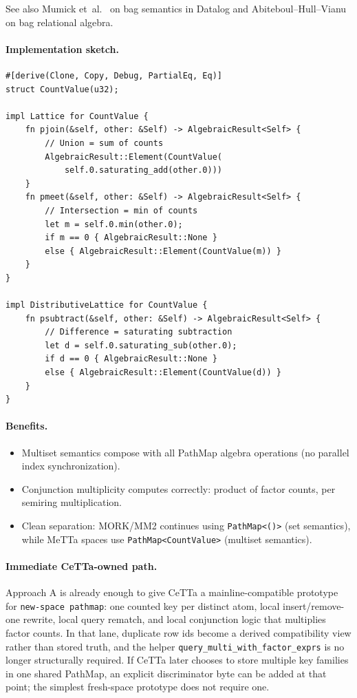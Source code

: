 \documentclass[11pt]{article}
\theoremstyle{definition}
\theoremstyle{remark}
\newcommand{\MORK}{\textup{MORK}}
\newcommand{\MeTTa}{\textup{MeTTa}}
\newcommand{\PathMap}{\textup{PathMap}}
\begin{document}
See also Mumick et~al.~\cite{MumickMagicDuplicates1990} on bag semantics
in Datalog and Abiteboul--Hull--Vianu~\cite{AHV1995} on bag relational
algebra.

\paragraph{Implementation sketch.}
\begin{lstlisting}[caption={Semiring \texttt{Lattice} for multiset counts (Rust pseudocode).}]
#[derive(Clone, Copy, Debug, PartialEq, Eq)]
struct CountValue(u32);

impl Lattice for CountValue {
    fn pjoin(&self, other: &Self) -> AlgebraicResult<Self> {
        // Union = sum of counts
        AlgebraicResult::Element(CountValue(
            self.0.saturating_add(other.0)))
    }
    fn pmeet(&self, other: &Self) -> AlgebraicResult<Self> {
        // Intersection = min of counts
        let m = self.0.min(other.0);
        if m == 0 { AlgebraicResult::None }
        else { AlgebraicResult::Element(CountValue(m)) }
    }
}

impl DistributiveLattice for CountValue {
    fn psubtract(&self, other: &Self) -> AlgebraicResult<Self> {
        // Difference = saturating subtraction
        let d = self.0.saturating_sub(other.0);
        if d == 0 { AlgebraicResult::None }
        else { AlgebraicResult::Element(CountValue(d)) }
    }
}
\end{lstlisting}

\paragraph{Benefits.}
\begin{itemize}[nosep]
  \item Multiset semantics compose with all \PathMap{} algebra operations
    (no parallel index synchronization).
  \item Conjunction multiplicity computes correctly: product of factor
    counts, per semiring multiplication.
  \item Clean separation: \MORK{}/MM2 continues using \texttt{PathMap<()>}
    (set semantics), while \MeTTa{} spaces use \texttt{PathMap<CountValue>}
    (multiset semantics).
\end{itemize}

\paragraph{Immediate CeTTa-owned path.}
Approach A is already enough to give CeTTa a mainline-compatible prototype
for \texttt{new-space pathmap}: one counted key per distinct atom, local
insert/remove-one rewrite, local query rematch, and local conjunction logic
that multiplies factor counts.  In that lane, duplicate row ids become a
derived compatibility view rather than stored truth, and the helper
\texttt{query\_multi\_with\_factor\_exprs} is no longer structurally required.
If CeTTa later chooses to store multiple key families in one shared \PathMap{},
an explicit discriminator byte can be added at that point; the simplest
fresh-space prototype does not require one.
\end{document}
